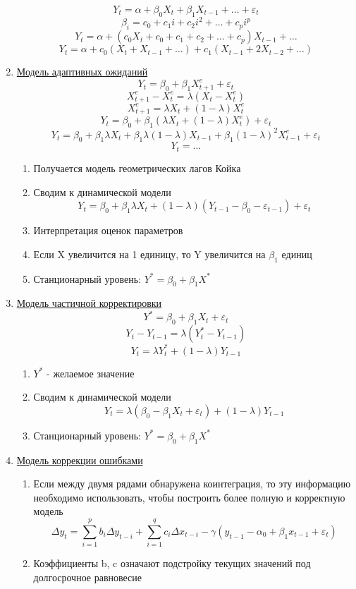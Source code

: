\documentclass[a4paper, 12pt]{article}
\begin{document}
\begin{enumerate}
    \[Y_t = \alpha + \beta_0 X_t + \beta_1 X_{t - 1} + \ldots + \varepsilon_t\]
    \[\beta_i = c_0 + c_1 i + c_2 i^2 + \ldots + c_p i^p\]
    \[Y_t = \alpha + (c_0 X_t + c_0 + c_1 + c_2 + \ldots + c_p) X_{t - 1} + \ldots\]
    \[Y_t = \alpha + c_0 (X_t + X_{t - 1} + \ldots) + c_1 (X_{t - 1} + 2X_{t - 2} + \ldots)\]
    
    \item \underline{Модель адаптивных ожиданий}
    \[Y_t = \beta_0 + \beta_1 X_{t + 1}^{e} + \varepsilon_t\]
    \[X_{t + 1}^e - X_t^e = \lambda (X_t - X_t^e)\] 
    \[X_{t + 1}^e = \lambda X_t + (1 - \lambda)X_t^e\]
    \[Y_t = \beta_0 + \beta_1 (\lambda X_t + (1 - \lambda) X_t^e) + \varepsilon_t\]
    \[Y_t = \beta_0 + \beta_1 \lambda X_t + \beta_1 \lambda (1 - \lambda) X_{t - 1} + \beta_1 (1 - \lambda)^2 X_{t - 1}^e + \varepsilon_t\]
    \[Y_t = \ldots\]
    \begin{enumerate}
        \item Получается модель геометрических лагов Койка
        \item Сводим к динамической модели
        \[Y_t = \beta_0 + \beta_1 \lambda X_t + (1 - \lambda)(Y_{t - 1} - \beta_0 - \varepsilon_{t - 1}) + \varepsilon_t\]
        \item Интерпретация оценок параметров
        \item Если X увеличится на 1 единицу, то Y увеличится на $\beta_1$ единиц
        \item Станционарный уровень: $Y^* = \beta_0 + \beta_1 X^*$
    \end{enumerate}
    \item \underline{Модель частичной корректировки}
    \[Y^* = \beta_0 + \beta_1 X_t + \varepsilon_t\]
    \[Y_t - Y_{t - 1} = \lambda (Y_t^* - Y_{t - 1})\]
    \[Y_t = \lambda Y_t^* + (1 - \lambda)Y_{t - 1}\]
    \begin{enumerate}
        \item $Y^*$ - желаемое значение
        \item Сводим к динамической модели
        \[Y_t = \lambda (\beta_0 - \beta_1 X_t + \varepsilon_t) + (1 - \lambda) Y_{t - 1}\]
        \item Станционарный уровень: $Y^* = \beta_0 + \beta_1 X^*$
    \end{enumerate}
    \item \underline{Модель коррекции ошибками}
    \begin{enumerate}
        \item Если между двумя рядами обнаружена коинтеграция, 
        то эту информацию необходимо использовать, чтобы построить более полную и корректную модель
        \[\Delta y_t = \sum_{i = 1}^{p}b_i \Delta y_{t - i} + \sum_{i = 1}^q c_i \Delta x_{t - i} - \gamma (y_{t - 1} - \alpha_0 + \beta_1 x_{t - 1} + \varepsilon_t)\]
        \item Коэффициенты b, c означают подстройку текущих значений
        под долгосрочное равновесие
    \end{enumerate}
\end{enumerate}
\end{document}
